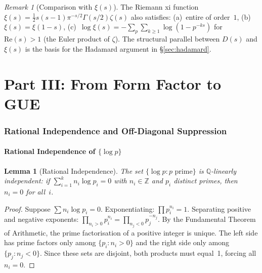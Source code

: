 \documentclass[11pt,a4paper]{article}
\theoremstyle{plain}
\newtheorem{lemma}[theorem]{Lemma}
\theoremstyle{remark}
\newtheorem{remark}[theorem]{Remark}
\newcommand{\Z}{\mathbb{Z}}
\newcommand{\Q}{\mathbb{Q}}
\begin{document}
\begin{remark}[Comparison with $\xi(s)$]\label{rem:xi-comparison}
The Riemann xi function $\xi(s)=\frac{1}{2}s(s-1)\pi^{-s/2}\Gamma(s/2)\zeta(s)$
also satisfies: (a)~entire of order~$1$, (b)~$\xi(s)=\xi(1-s)$,
(c)~$\log\xi(s)=-\sum_p\sum_{k\geq 1}\log(1-p^{-ks})$ for
$\mathrm{Re}(s)>1$ (the Euler product of $\zeta$).  The structural
parallel between $D(s)$ and $\xi(s)$ is the basis for the Hadamard
argument in \S\ref{sec:hadamard}.
\end{remark}



\part*{Part III: From Form Factor to GUE}

\section{Rational Independence and Off-Diagonal Suppression}
\label{sec:rational-independence}

\subsection{Rational Independence of $\{\log p\}$}

\begin{lemma}[Rational Independence]\label{lem:rational-independence}
The set $\{\log p:p\text{ prime}\}$ is $\Q$-linearly independent: if
$\sum_{i=1}^k n_i\log p_i=0$ with $n_i\in\Z$ and $p_i$ distinct primes,
then $n_i=0$ for all~$i$.
\end{lemma}

\begin{proof}
Suppose $\sum n_i\log p_i=0$. Exponentiating: $\prod p_i^{n_i}=1$.
Separating positive and negative exponents:
$\prod_{n_i>0}p_i^{n_i}=\prod_{n_j<0}p_j^{-n_j}$.
By the Fundamental Theorem of Arithmetic, the prime factorisation of a
positive integer is unique. The left side has prime factors only among
$\{p_i:n_i>0\}$ and the right side only among $\{p_j:n_j<0\}$.
Since these sets are disjoint, both products must equal~1,
forcing all $n_i=0$.
\end{proof}
\end{document}
